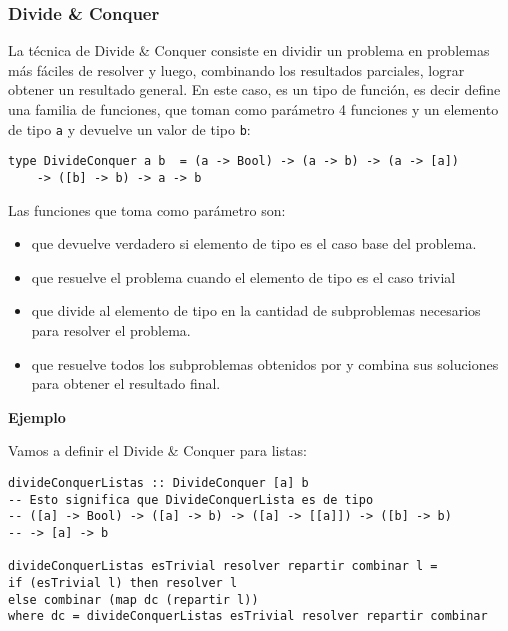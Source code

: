 \subsubsection{Divide \& Conquer}
La técnica de Divide \& Conquer consiste en dividir un problema en problemas más fáciles de resolver y luego, combinando los resultados parciales, lograr
obtener un resultado general. En este caso,  es un tipo de función, es decir define una familia de funciones, que toman como parámetro 4 funciones y un elemento de tipo \texttt{a} y devuelve un valor de tipo \texttt{b}:
\begin{centrado}
	\begin{verbatim}
type DivideConquer a b  = (a -> Bool) -> (a -> b) -> (a -> [a]) 
    -> ([b] -> b) -> a -> b                         
	\end{verbatim}
\end{centrado}
Las funciones que toma como parámetro son:
\begin{itemize}
	\item {} que devuelve verdadero si elemento de tipo  es el caso base del problema.
	\item {} que resuelve el problema cuando el elemento de tipo  es el caso trivial
	\item {} que divide al elemento de tipo  en la cantidad de subproblemas necesarios para resolver el problema.
	\item {} que resuelve todos los subproblemas obtenidos por  y combina sus soluciones para obtener el resultado final.
\end{itemize}

\textbf{Ejemplo}

Vamos a definir el Divide \& Conquer para listas:
\begin{centrado}
	\begin{verbatim}
divideConquerListas :: DivideConquer [a] b
-- Esto significa que DivideConquerLista es de tipo 
-- ([a] -> Bool) -> ([a] -> b) -> ([a] -> [[a]]) -> ([b] -> b)
-- -> [a] -> b
		
divideConquerListas esTrivial resolver repartir combinar l =
if (esTrivial l) then resolver l
else combinar (map dc (repartir l))
where dc = divideConquerListas esTrivial resolver repartir combinar	
	\end{verbatim}
\end{centrado}


